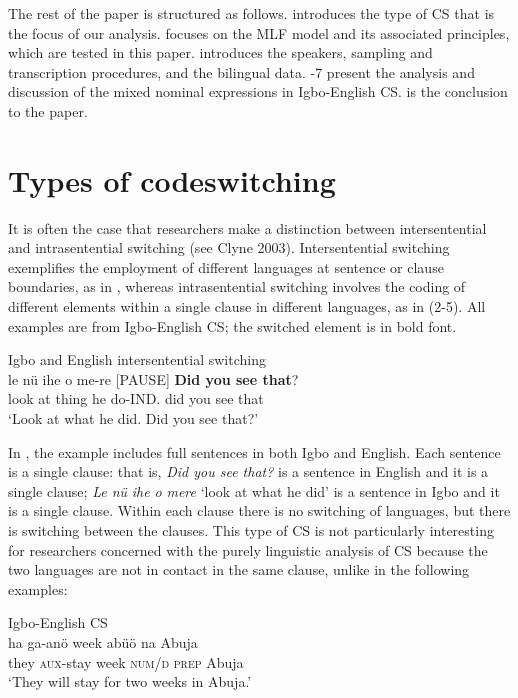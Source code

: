 \documentclass[output=paper]{langsci/langscibook}
\begin{document}
The rest of the paper is structured as follows.  introduces the type of CS that is the focus of our analysis.  focuses on the MLF model and its associated principles, which are tested in this paper.  introduces the speakers, sampling and transcription procedures, and the bilingual data. -7 present the analysis and discussion of the mixed nominal expressions in Igbo-English CS.  is the conclusion to the paper.  

\section{Types of codeswitching}

It is often the case that researchers make a distinction between intersentential and intrasentential switching (see Clyne 2003). Intersentential switching exemplifies the employment of different languages at sentence or clause boundaries, as in , whereas intrasentential switching involves the coding of different elements within a single clause in different languages, as in (2-5). All examples are from Igbo-English CS; the switched element is in bold font.

\ea
{Igbo and English intersentential switching\rmfnm{}}\\
\gll le    nü  ihe  o   me-re    [PAUSE] \textbf{Did you see that}?\\
     look  at  thing  he do-IND.                did  you see that\\
\glt ‘Look at what he did. Did you see that?’
\z
{}


In , the example includes full sentences in both Igbo and English. Each sentence is a single clause: that is, \textit{Did you see that? }is a sentence in English and it is a single clause; \textit{Le n}\textit{ü}\textit{ ihe o }\textit{mere} ‘look at what he did’ is a sentence in Igbo and it is a single clause. Within each clause there is no switching of languages, but there is switching between the clauses. This type of CS is not particularly interesting for researchers concerned with the purely linguistic analysis of CS because the two languages are not in contact in the same clause, unlike in the following examples:


\ea
{Igbo-English \textsc{CS}}\\
\gll ha    ga-anö     week  abüö  na  Abuja\\
     they  \textsc{aux}{}-stay  week  \textsc{num/d}  \textsc{prep} Abuja\\
\glt ‘They will stay for two weeks in Abuja.’
\z
\end{document}
